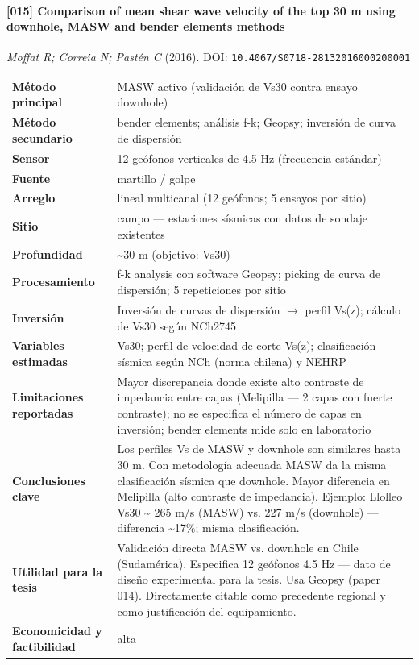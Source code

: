 \paragraph{[015] Comparison of mean shear wave velocity of the top 30 m using downhole, MASW and bender elements methods} \emph{Moffat R; Correia N; Pastén C} (2016).
{\scriptsize DOI: \texttt{10.4067/S0718-28132016000200001}}

\begin{center}\scriptsize
\begin{tabularx}{\textwidth}{@{}>{\bfseries}p{3.3cm} X@{}}
\toprule
M\'etodo principal & MASW activo (validación de Vs30 contra ensayo downhole) \\
M\'etodo secundario & bender elements; análisis f-k; Geopsy; inversión de curva de dispersión \\
Sensor & 12 geófonos verticales de 4.5 Hz (frecuencia estándar) \\
Fuente & martillo / golpe \\
Arreglo & lineal multicanal (12 geófonos; 5 ensayos por sitio) \\
Sitio & campo --- estaciones sísmicas con datos de sondaje existentes \\
Profundidad & \textasciitilde{}30 m (objetivo: Vs30) \\
Procesamiento & f-k analysis con software Geopsy; picking de curva de dispersión; 5 repeticiones por sitio \\
Inversi\'on & Inversión de curvas de dispersión $\rightarrow$ perfil Vs(z); cálculo de Vs30 según NCh2745 \\
Variables estimadas & Vs30; perfil de velocidad de corte Vs(z); clasificación sísmica según NCh (norma chilena) y NEHRP \\
Limitaciones reportadas & Mayor discrepancia donde existe alto contraste de impedancia entre capas (Melipilla --- 2 capas con fuerte contraste); no se especifica el número de capas en inversión; bender elements mide solo en laboratorio \\
Conclusiones clave & Los perfiles Vs de MASW y downhole son similares hasta 30 m. Con metodología adecuada MASW da la misma clasificación sísmica que downhole. Mayor diferencia en Melipilla (alto contraste de impedancia). Ejemplo: Llolleo Vs30 \textasciitilde{} 265 m/s (MASW) vs. 227 m/s (downhole) --- diferencia \textasciitilde{}17\%; misma clasificación. \\
Utilidad para la tesis & Validación directa MASW vs. downhole en Chile (Sudamérica). Especifica 12 geófonos 4.5 Hz --- dato de diseño experimental para la tesis. Usa Geopsy (paper 014). Directamente citable como precedente regional y como justificación del equipamiento. \\
Economicidad y factibilidad & alta \\
\bottomrule
\end{tabularx}
\end{center}

